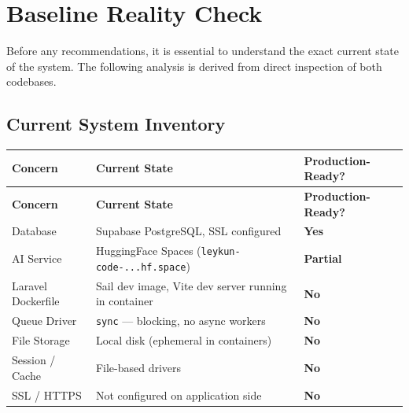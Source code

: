 \documentclass[12pt,a4paper]{report}
\begin{document}
\chapter{Baseline Reality Check}
\label{ch:baseline}

Before any recommendations, it is essential to understand the exact
current state of the system. The following analysis is derived from
direct inspection of both codebases.

\section{Current System Inventory}

\begin{longtable}{L{4cm} L{5.5cm} C{2.5cm}}
    \toprule
    \textbf{Concern} & \textbf{Current State} & \textbf{Production-Ready?} \\
    \midrule
    \endfirsthead
    \toprule
    \textbf{Concern} & \textbf{Current State} & \textbf{Production-Ready?} \\
    \midrule
    \endhead
    \bottomrule
    \endlastfoot

    Database &
    Supabase PostgreSQL, SSL configured &
    \textcolor{successgreen}{\textbf{Yes}} \\[4pt]

    AI Service &
    HuggingFace Spaces (\texttt{leykun-code-...hf.space}) &
    \textcolor{warningorange}{\textbf{Partial}} \\[4pt]

    Laravel Dockerfile &
    Sail dev image, Vite dev server running in container &
    \textcolor{dangerred}{\textbf{No}} \\[4pt]

    Queue Driver &
    \texttt{sync} — blocking, no async workers &
    \textcolor{dangerred}{\textbf{No}} \\[4pt]

    File Storage &
    Local disk (ephemeral in containers) &
    \textcolor{dangerred}{\textbf{No}} \\[4pt]

    Session / Cache &
    File-based drivers &
    \textcolor{dangerred}{\textbf{No}} \\[4pt]

    SSL / HTTPS &
    Not configured on application side &
    \textcolor{dangerred}{\textbf{No}} \\[4pt]


\end{longtable}
\end{document}
